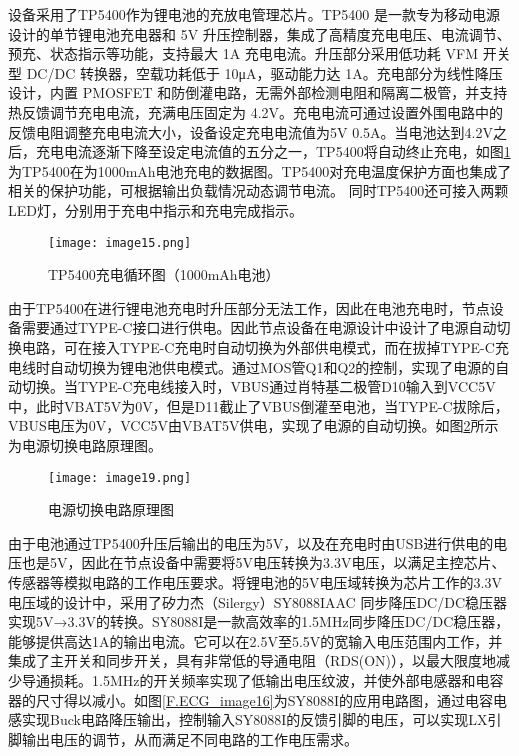 设备采用了TP5400作为锂电池的充放电管理芯片。TP5400 是一款专为移动电源设计的单节锂电池充电器和 5V 升压控制器，集成了高精度充电电压、电流调节、预充、状态指示等功能，支持最大 1A 充电电流。升压部分采用低功耗 VFM 开关型 DC/DC 转换器，空载功耗低于 10μA，驱动能力达 1A。充电部分为线性降压设计，内置 PMOSFET 和防倒灌电路，无需外部检测电阻和隔离二极管，并支持热反馈调节充电电流，充满电压固定为 4.2V\cite{TP5400}。充电电流可通过设置外围电路中的反馈电阻调整充电电流大小，设备设定充电电流值为5V 0.5A。当电池达到4.2V之后，充电电流逐渐下降至设定电流值的五分之一，TP5400将自动终止充电，如图\ref{F.ECG_image15}为TP5400在为1000mAh电池充电的数据图\cite{TP5400}。TP5400对充电温度保护方面也集成了相关的保护功能，可根据输出负载情况动态调节电流。 同时TP5400还可接入两颗LED灯，分别用于充电中指示和充电完成指示。

\begin{figure}[hbt]
    \centering
    \texttt{[image: image15.png]}
    \caption{TP5400充电循环图（1000mAh电池）\cite{TP5400}}
    \label{F.ECG_image15}
\end{figure}

由于TP5400在进行锂电池充电时升压部分无法工作，因此在电池充电时，节点设备需要通过TYPE-C接口进行供电。因此节点设备在电源设计中设计了电源自动切换电路，可在接入TYPE-C充电时自动切换为外部供电模式，而在拔掉TYPE-C充电线时自动切换为锂电池供电模式。通过MOS管Q1和Q2的控制，实现了电源的自动切换。当TYPE-C充电线接入时，VBUS通过肖特基二极管D10输入到VCC5V中，此时VBAT5V为0V，但是D11截止了VBUS倒灌至电池，当TYPE-C拔除后，VBUS电压为0V，VCC5V由VBAT5V供电，实现了电源的自动切换。如图\ref{F.ECG_image19}所示为电源切换电路原理图。

\begin{figure}[hbt]
    \centering
    \texttt{[image: image19.png]}
    \caption{电源切换电路原理图}
    \label{F.ECG_image19}
\end{figure}

由于电池通过TP5400升压后输出的电压为5V，以及在充电时由USB进行供电的电压也是5V，因此在节点设备中需要将5V电压转换为3.3V电压，以满足主控芯片、传感器等模拟电路的工作电压要求。将锂电池的5V电压域转换为芯片工作的3.3V电压域的设计中，采用了矽力杰（Silergy）SY8088IAAC 同步降压DC/DC稳压器实现5V→3.3V的转换。SY8088I是一款高效率的1.5MHz同步降压DC/DC稳压器，能够提供高达1A的输出电流。它可以在2.5V至5.5V的宽输入电压范围内工作，并集成了主开关和同步开关，具有非常低的导通电阻（RDS(ON)），以最大限度地减少导通损耗\cite{SY8088}。1.5MHz的开关频率实现了低输出电压纹波，并使外部电感器和电容器的尺寸得以减小。如图\ref{F.ECG_image16}为SY8088I的应用电路图，通过电容电感实现Buck电路降压输出，控制输入SY8088I的反馈引脚的电压，可以实现LX引脚输出电压的调节，从而满足不同电路的工作电压需求。

